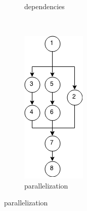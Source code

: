 \begin{figure}[h!]
\begin{subfigure}[b]{0.16\textwidth}
        \caption{dependencies}
    \end{subfigure}%
    ~
    \begin{subfigure}[b]{0.16\textwidth}
        \includegraphics[width=\textwidth]{images/parallel.png}
        \caption{parallelization}
    \end{subfigure}
\end{figure}

